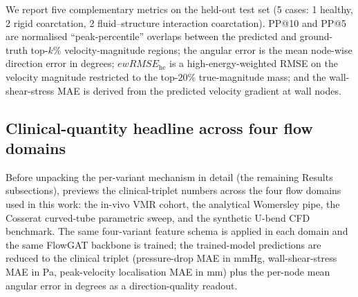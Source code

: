 \documentclass[10pt,a4paper]{article}
\newcommand{\ewRMSE}{ewRMSE_{\text{he}}}
\begin{document}
We report five complementary metrics on the held-out test set
(5 cases: 1 healthy, 2 rigid coarctation, 2 fluid--structure
interaction coarctation). PP@10 and PP@5 are normalised
``peak-percentile'' overlaps between the predicted and ground-truth
top-$k\%$ velocity-magnitude regions; the angular error is the mean
node-wise direction error in degrees; $\ewRMSE$ is a
high-energy-weighted RMSE on the velocity magnitude restricted to the
top-$20\%$ true-magnitude mass; and the wall-shear-stress MAE is
derived from the predicted velocity gradient at wall nodes.

\subsection*{Clinical-quantity headline across four flow domains}
\label{sec:clin_headline}

Before unpacking the per-variant mechanism in detail (the remaining
Results subsections),  previews the
clinical-triplet numbers across the four flow domains used in this
work: the in-vivo VMR cohort, the analytical Womersley pipe, the
Cosserat curved-tube parametric sweep, and the synthetic U-bend CFD
benchmark. The same four-variant feature schema is applied in each
domain and the same FlowGAT backbone is trained; the trained-model
predictions are reduced to the clinical triplet (pressure-drop MAE
in mmHg, wall-shear-stress MAE in Pa, peak-velocity localisation
MAE in mm) plus the per-node mean angular error in degrees as a
direction-quality readout.
\end{document}
